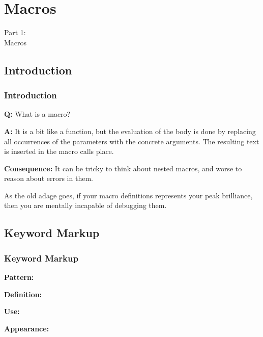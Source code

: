 {
\renewcommand{\bgcolor}{macros}

\section{Macros}
\begin{frame}
  \vspace{25mm}
  \begin{center}
    \Huge{Part 1:\\Macros}
  \end{center}
\end{frame}

\subsection{Introduction}
\begin{frame}[fragile]
  \frametitle{Introduction}
  \vspace{3mm}
  \textbf{Q:} What is a macro?
  
  \pause
  \vspace{5mm}
  \textbf{A:} It is a bit like a function, but the evaluation of the body is done by replacing all occurrences of the parameters with the concrete arguments. The resulting text is inserted in the macro calls place.
  
  \pause
  \vspace{5mm}
  \textbf{Consequence:} It can be tricky to think about nested macros, and worse to reason about errors in them.
  
  \pause
  \vspace{5mm}
  As the old adage goes, if your macro definitions represents your peak brilliance, then you are mentally incapable of debugging them.
\end{frame}

\subsection{Keyword Markup}
\begin{frame}[fragile]
  \frametitle{Keyword Markup}
  \vspace{3mm}
  \textbf{Pattern:}
  
  \vspace{5mm}
  \textbf{Definition:}
  
  \vspace{5mm}
  \textbf{Use:}
  
  \vspace{5mm}
  \textbf{Appearance:}
\end{frame}

}
